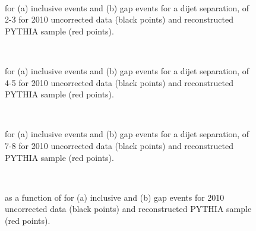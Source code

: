 \begin{figure}
\centering
\mbox{
              \quad
              \quad
                              }
\caption[Comparison of the data and PYTHIA for \dphidyDist{} with $2<\dy{}<3$]{
\dphidyDist{} for (a) inclusive events and (b) gap events for a dijet separation, \dy{} of 2-3 for 2010 uncorrected data (black points) and reconstructed PYTHIA sample (red points).
\label{GBJ2:Uncorr:dphi23}}
\end{figure}


\begin{figure}
\centering
\mbox{
              \quad
              \quad
                              }
\caption[Comparison of the data and PYTHIA for \dphidyDist{} with $4<\dy{}<5$]{
\dphidyDist{} for (a) inclusive events and (b) gap events for a dijet separation, \dy{} of 4-5 for 2010 uncorrected data (black points) and reconstructed PYTHIA sample (red points).
\label{GBJ2:Uncorr:dphi45}}
\end{figure}



\begin{figure}
\centering
\mbox{
              \quad
              \quad
                              }
\caption[Comparison of the data and PYTHIA for \dphidyDist{} with $7<\dy{}<8$]{
\dphidyDist{} for (a) inclusive events and (b) gap events for a dijet separation, \dy{} of 7-8 for 2010 uncorrected data (black points) and reconstructed PYTHIA sample (red points).
\label{GBJ2:Uncorr:dphi78}}
\end{figure}



\begin{figure}
\centering
\mbox{
              \quad
              \quad
                              }
\caption[Comparison of the data and PYTHIA for \cosdphi{}]{
\mean{\cosdphi{}} as a function of \dy{} for (a) inclusive and (b) gap events for 2010 uncorrected data (black points) and reconstructed PYTHIA sample (red points).
\label{GBJ2:Uncorr:cos}}
\end{figure}


